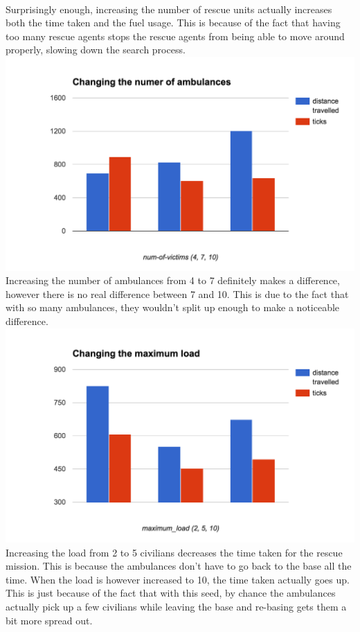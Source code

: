 \documentclass[titlepage]{article}
\begin{document}
    \\
    Surprisingly enough, increasing the number of rescue units actually increases both the time taken and the fuel usage. This is because of the fact that having too many rescue agents stops the rescue agents from being able to move around properly, slowing down the search process.
    \\
    \includegraphics[width=\textwidth,height=\textheight,keepaspectratio]{1ambs.png}
    \\
    Increasing the number of ambulances from 4 to 7 definitely makes a difference, however there is no real difference between 7 and 10. This is due to the fact that with so many ambulances, they wouldn't split up enough to make a noticeable difference.
    \\
    \includegraphics[width=\textwidth,height=\textheight,keepaspectratio]{1load.png}
    \\
    Increasing the load from 2 to 5 civilians decreases the time taken for the rescue mission. This is because the ambulances don't have to go back to the base all the time. When the load is however increased to 10, the time taken actually goes up. This is just because of the fact that with this seed, by chance the ambulances actually pick up a few civilians while leaving the base and re-basing gets them a bit more spread out.
  
\end{document}
